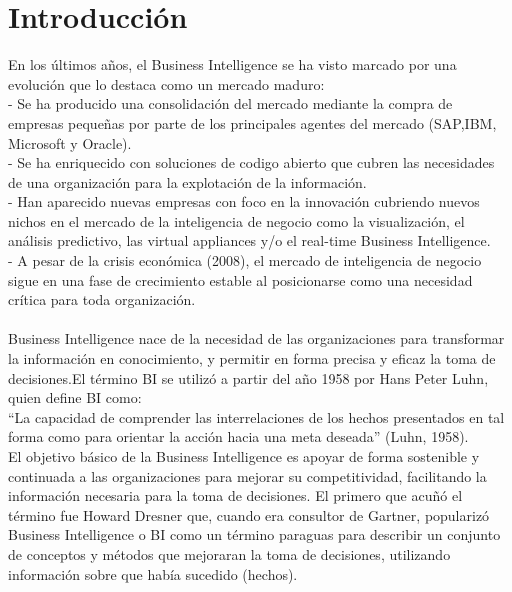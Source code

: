 \documentclass[%
 reprint,
 amsmath,amssymb,
 aps,
]{revtex4-1}
\begin{document}

\section {Introducción}\label{sec:1}

En los últimos años, el Business Intelligence se ha visto marcado por una evolución que lo destaca como un mercado maduro: \\
- Se ha producido una consolidación del mercado mediante la compra de empresas pequeñas por parte de los principales agentes del mercado (SAP,IBM, Microsoft y Oracle). \\
- Se ha enriquecido con soluciones de codigo abierto que cubren las necesidades de una organización para la explotación de la información.\\
- Han aparecido nuevas empresas con foco en la innovación cubriendo nuevos nichos en el mercado de la inteligencia de negocio como la visualización, el análisis predictivo, las virtual appliances y/o el real-time Business Intelligence.\\
- A pesar de la crisis económica (2008), el mercado de inteligencia de negocio sigue en una fase de crecimiento estable al posicionarse como una necesidad crítica para toda organización.\cite{ref1}\\\\

Business Intelligence nace de la necesidad de las organizaciones para transformar la información en conocimiento, y permitir en forma precisa y eficaz la toma de decisiones\cite{ref3}.El término BI se utilizó a partir del año 1958 por Hans Peter Luhn, quien define BI como: \\
“La capacidad de comprender las interrelaciones de los hechos presentados en tal forma como para orientar la acción hacia una meta deseada” (Luhn, 1958).\cite{ref4} \\
El objetivo básico de la Business Intelligence es apoyar de forma sostenible
y continuada a las organizaciones para mejorar su competitividad, facilitando la información necesaria para la toma de decisiones. El primero que
acuñó el término fue Howard Dresner que, cuando era consultor de Gartner, popularizó Business Intelligence o BI como un término paraguas para describir un conjunto de conceptos y métodos que mejoraran la toma de
decisiones, utilizando información sobre que había sucedido (hechos).\cite{ref2} \\\\
\end{document}
